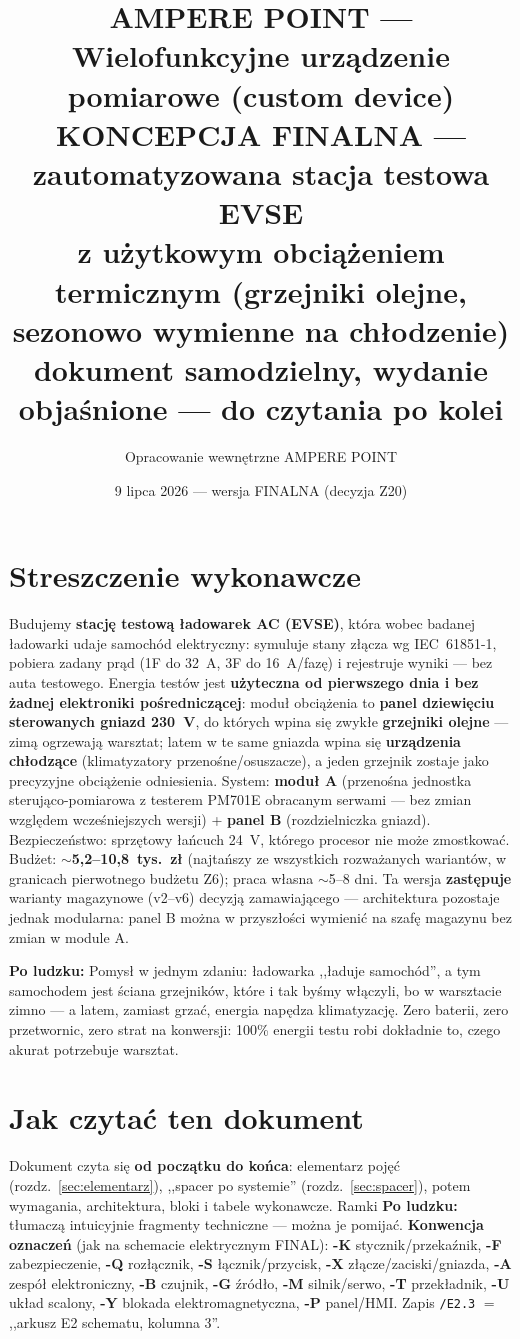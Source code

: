 \documentclass[11pt,a4paper]{article}
\title{\textbf{AMPERE POINT --- Wielofunkcyjne urządzenie pomiarowe (custom device)}\\[4pt]
\large KONCEPCJA FINALNA --- zautomatyzowana stacja testowa EVSE\\
z użytkowym obciążeniem termicznym (grzejniki olejne, sezonowo wymienne na chłodzenie)\\[2pt]
\normalsize dokument samodzielny, wydanie objaśnione --- do czytania po kolei}
\author{Opracowanie wewnętrzne AMPERE POINT}
\date{9 lipca 2026 --- wersja FINALNA (decyzja Z20)}
\newcommand{\why}[1]{\par\smallskip\noindent\colorbox{blue!6}{\parbox{0.965\linewidth}{\small\textbf{Po ludzku:} #1}}\par\smallskip}
\begin{document}
\maketitle
\vspace{-1.4em}

\section*{Streszczenie wykonawcze}
Budujemy \textbf{stację testową ładowarek AC (EVSE)}, która wobec badanej ładowarki udaje samochód
elektryczny: symuluje stany złącza wg IEC~61851-1, pobiera zadany prąd (1F do 32~A, 3F do 16~A/fazę)
i rejestruje wyniki --- bez auta testowego. Energia testów jest \textbf{użyteczna od pierwszego dnia
i bez żadnej elektroniki pośredniczącej}: moduł obciążenia to \textbf{panel dziewięciu sterowanych
gniazd 230~V}, do których wpina się zwykłe \textbf{grzejniki olejne} --- zimą ogrzewają warsztat;
latem w te same gniazda wpina się \textbf{urządzenia chłodzące} (klimatyzatory przenośne/osuszacze),
a jeden grzejnik zostaje jako precyzyjne obciążenie odniesienia. System: \textbf{moduł A} (przenośna
jednostka sterująco-pomiarowa z testerem PM701E obracanym serwami --- bez zmian względem wcześniejszych
wersji) + \textbf{panel B} (rozdzielniczka gniazd). Bezpieczeństwo: sprzętowy łańcuch 24~V, którego
procesor nie może zmostkować. Budżet: \textbf{$\sim$5,2--10,8~tys.~zł} (najtańszy ze wszystkich
rozważanych wariantów, w granicach pierwotnego budżetu Z6); praca własna $\sim$5--8 dni.
Ta wersja \textbf{zastępuje} warianty magazynowe (v2--v6) decyzją zamawiającego --- architektura
pozostaje jednak modularna: panel B można w przyszłości wymienić na szafę magazynu bez zmian w module A.
\why{Pomysł w jednym zdaniu: ładowarka ,,ładuje samochód'', a tym samochodem jest ściana grzejników,
które i tak byśmy włączyli, bo w warsztacie zimno --- a latem, zamiast grzać, energia napędza
klimatyzację. Zero baterii, zero przetwornic, zero strat na konwersji: 100\% energii testu robi
dokładnie to, czego akurat potrzebuje warsztat.}

\tableofcontents

\section{Jak czytać ten dokument}
Dokument czyta się \textbf{od początku do końca}: elementarz pojęć (rozdz.~\ref{sec:elementarz}),
,,spacer po systemie'' (rozdz.~\ref{sec:spacer}), potem wymagania, architektura, bloki i tabele
wykonawcze. Ramki \colorbox{blue!6}{\small\textbf{Po ludzku:}} tłumaczą intuicyjnie fragmenty
techniczne --- można je pomijać. \textbf{Konwencja oznaczeń} (jak na schemacie elektrycznym FINAL):
\textbf{-K} stycznik/przekaźnik, \textbf{-F} zabezpieczenie, \textbf{-Q} rozłącznik, \textbf{-S}
łącznik/przycisk, \textbf{-X} złącze/zaciski/gniazda, \textbf{-A} zespół elektroniczny, \textbf{-B}
czujnik, \textbf{-G} źródło, \textbf{-M} silnik/serwo, \textbf{-T} przekładnik, \textbf{-U} układ
scalony, \textbf{-Y} blokada elektromagnetyczna, \textbf{-P} panel/HMI. Zapis \texttt{/E2.3} $=$
,,arkusz E2 schematu, kolumna 3''.
\end{document}
